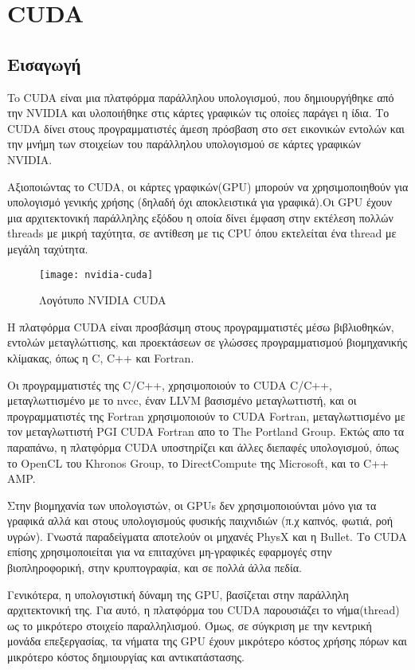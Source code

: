 \section{CUDA}
\subsection{Εισαγωγή}
To CUDA είναι μια πλατφόρμα παράλληλου υπολογισμού, που δημιουργήθηκε από την NVIDIA και υλοποιήθηκε στις κάρτες γραφικών τις οποίες παράγει η ίδια. Το CUDA δίνει στους προγραμματιστές άμεση πρόσβαση στο σετ εικονικών εντολών και την μνήμη των στοιχείων του παράλληλου υπολογισμού σε κάρτες γραφικών NVIDIA. 

Αξιοποιώντας το CUDA, οι κάρτες γραφικών(GPU) μπορούν να χρησιμοποιηθούν για υπολογισμό γενικής χρήσης (δηλαδή όχι αποκλειστικά για γραφικά).Οι GPU έχουν μια αρχιτεκτονική παράλληλης εξόδου η οποία δίνει έμφαση στην εκτέλεση πολλών threads με μικρή ταχύτητα, σε αντίθεση με τις CPU όπου εκτελείται ένα thread με μεγάλη ταχύτητα. 

\begin{figure}[h]
\centering
\texttt{[image: nvidia-cuda]}
\caption{Λογότυπο NVIDIA CUDA}
\end{figure}

Η πλατφόρμα CUDA είναι προσβάσιμη στους προγραμματιστές μέσω βιβλιοθηκών, εντολών μεταγλώττισης, και προεκτάσεων σε γλώσσες προγραμματισμού βιομηχανικής κλίμακας, όπως η C, C++ και Fortran.

Οι προγραμματιστές της C/C++, χρησιμοποιούν το CUDA C/C++, μεταγλωττισμένο με το nvcc, έναν LLVM βασισμένο μεταγλωττιστή, και οι προγραμματιστές της Fortran χρησιμοποιούν το CUDA Fortran, μεταγλωττισμένο με τον μεταγλωττιστή PGI CUDA Fortran απο το The Portland Group. Εκτώς απο τα παραπάνω, η πλατφόρμα CUDA υποστηρίζει και άλλες διεπαφές υπολογισμού, όπως το OpenCL του Khronos Group, το DirectCompute της Microsoft, και το C++ AMP.

Στην βιομηχανία των υπολογιστών, οι GPUs δεν χρησιμοποιούνται μόνο για τα γραφικά αλλά και στους υπολογισμούς φυσικής παιχνιδιών (π.χ καπνός, φωτιά, ροή υγρών). Γνωστά παραδείγματα αποτελούν οι μηχανές PhysX και η Bullet. Το CUDA επίσης χρησιμοποιείται για να επιταχύνει μη-γραφικές εφαρμογές στην βιοπληροφορική, στην κρυπτογραφία, και σε πολλά άλλα πεδία.

Γενικότερα, η υπολογιστική δύναμη της GPU, βασίζεται στην παράλληλη αρχιτεκτονική της. Για αυτό, η πλατφόρμα του CUDA παρουσιάζει το νήμα(thread) ως το μικρότερο στοιχείο παραλληλισμού. Όμως, σε σύγκριση με την κεντρική μονάδα επεξεργασίας, τα νήματα της GPU έχουν μικρότερο κόστος χρήσης πόρων και μικρότερο κόστος δημιουργίας και αντικατάστασης.

